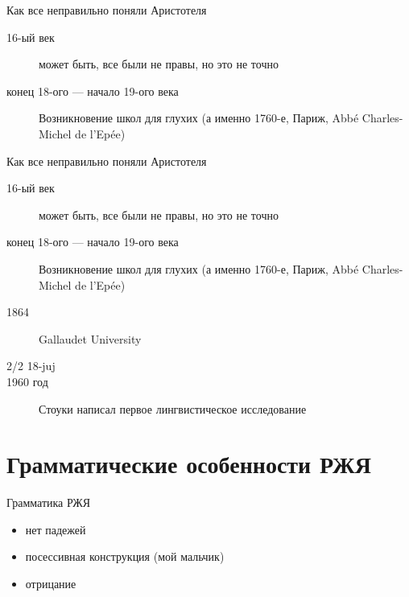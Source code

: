 \documentclass[13pt, t]{beamer}
\begin{document}
\begin{frame}{Как все неправильно поняли Аристотеля}
    \begin{description}
        \item[16-ый век] может быть, все были не правы, но это не точно \pause
        \item[конец 18-ого --- начало 19-ого века] Возникновение школ для глухих (а именно 1760-е, Париж, Abbé Charles-Michel de l’Epée)
    \end{description}
\end{frame}

\begin{frame}{Как все неправильно поняли Аристотеля}
    \begin{description}
        \item[16-ый век] может быть, все были не правы, но это не точно
        \item[конец 18-ого --- начало 19-ого века] Возникновение школ для глухих (а именно 1760-е, Париж, Abbé Charles-Michel de l’Epée)
        \item[1864] Gallaudet University \pause
        \item[2/2 18-juj]
        \item[1960 год] Стоуки написал первое лингвистическое исследование
    \end{description}
\end{frame}

\section{Грамматические особенности РЖЯ} %
\begin{frame}{Грамматика РЖЯ}
\begin{itemize}
    \item нет падежей
    \item посессивная конструкция (мой мальчик)
    \item отрицание
\end{itemize}
\end{frame}
\end{document}

